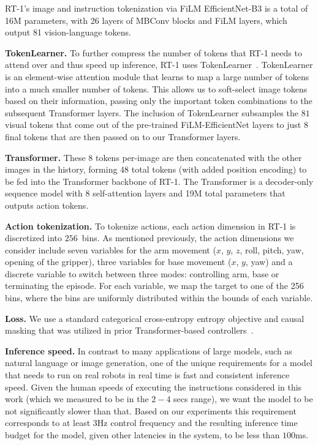 \documentclass{article} %
\newcommand{\algname}{RT-1\xspace}
\begin{document}
\algname's image and instruction tokenization via FiLM EfficientNet-B3 is a total of 16M parameters, with 26 layers of MBConv blocks and FiLM layers, which output 81 vision-language tokens.

\textbf{TokenLearner.}
To further compress the number of tokens that \algname needs to attend over and thus speed up inference, \algname uses TokenLearner~\citep{ryoo2021tokenlearner}.
TokenLearner is an element-wise attention module that learns to map a large number of tokens into a much smaller number of tokens. This allows us to soft-select image tokens based on their information, passing only the important token combinations to the subsequent Transformer layers.
The inclusion of TokenLearner subsamples the $81$ visual tokens that come out of the pre-trained FiLM-EfficientNet layers to just $8$ final tokens that are then passed on to our Transformer layers.

\textbf{Transformer.}
These 8 tokens per-image are then concatenated with the other images in the history, forming 48 total tokens (with added position encoding) to be fed into the Transformer backbone of \algname.
The Transformer is a decoder-only sequence model with 8 self-attention layers and 19M total parameters that outputs action tokens.


\textbf{Action tokenization.}
To tokenize actions, each action dimension in \algname is discretized into $256$~bins. As mentioned previously, the action dimensions we consider include seven variables for the arm movement ($x$, $y$, $z$, roll, pitch, yaw, opening of the gripper), three variables for base movement ($x$, $y$, yaw) and a discrete variable to switch between three modes: controlling arm, base or terminating the episode.
For each variable, we map the target to one of the 256 bins, where the bins are uniformly distributed within the bounds of each variable. 


\textbf{Loss.}
We use a standard categorical cross-entropy entropy objective and causal masking that was utilized in prior Transformer-based controllers~\citep{reed2022generalist, lee2022multi}.

\textbf{Inference speed.}
In contrast to many applications of large models, such as natural language or image generation, one of the unique requirements for a model that needs to run on real robots in real time is fast and consistent inference speed. 
Given the human speeds of executing the instructions considered in this work (which we measured to be in the $2-4$ secs range), we want the model to be not significantly slower than that. Based on our experiments this requirement corresponds to at least $3$Hz control frequency and the resulting inference time budget for the model, given other latencies in the system, to be less than $100$ms. 
\end{document}
